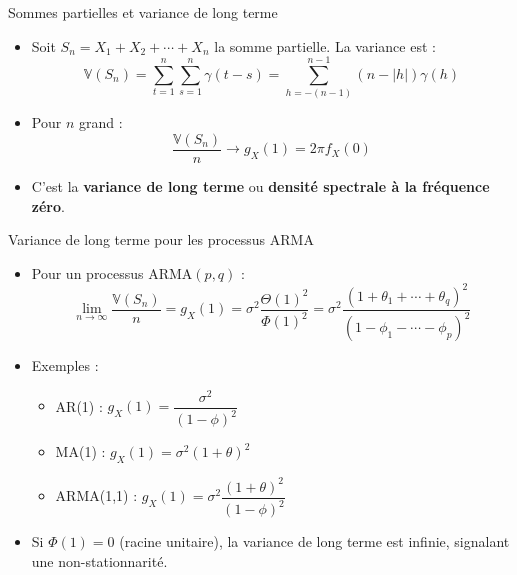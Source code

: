 \documentclass[11pt,aspectratio=169]{beamer}
\newcommand{\Var}{\mathbb{V}}
\begin{document}
\begin{frame}{Sommes partielles et variance de long terme}

\begin{itemize}

\item Soit $S_n = X_1 + X_2 + \cdots + X_n$ la somme partielle. La variance est :
  \[
  \Var(S_n) = \sum_{t=1}^{n}\sum_{s=1}^{n} \gamma(t-s) = \sum_{h=-(n-1)}^{n-1} (n - |h|)\gamma(h)
  \]\newline

\item Pour $n$ grand :
  \[
  \frac{\Var(S_n)}{n} \to g_X(1) = 2\pi f_X(0)
  \]\newline

\item C'est la \textbf{variance de long terme} ou \textbf{densité spectrale à la fréquence zéro}.

\end{itemize}

\end{frame}

\begin{frame}{Variance de long terme pour les processus ARMA}

\begin{itemize}

\item Pour un processus ARMA$(p,q)$ :
  \[
  \lim_{n\to\infty} \frac{\Var(S_n)}{n} = g_X(1) = \sigma^2 \frac{\Theta(1)^2}{\Phi(1)^2} = \sigma^2 \frac{(1+\theta_1+\cdots+\theta_q)^2}{(1-\phi_1-\cdots-\phi_p)^2}
  \]\newline

\item Exemples :
  \begin{itemize}
  \item AR(1) : $g_X(1) = \dfrac{\sigma^2}{(1-\phi)^2}$\newline
  \item MA(1) : $g_X(1) = \sigma^2(1+\theta)^2$\newline
  \item ARMA(1,1) : $g_X(1) = \sigma^2\dfrac{(1+\theta)^2}{(1-\phi)^2}$
  \end{itemize}

\item Si $\Phi(1) = 0$ (racine unitaire), la variance de long terme est infinie, signalant une non-stationnarité.

\end{itemize}

\end{frame}
\end{document}
